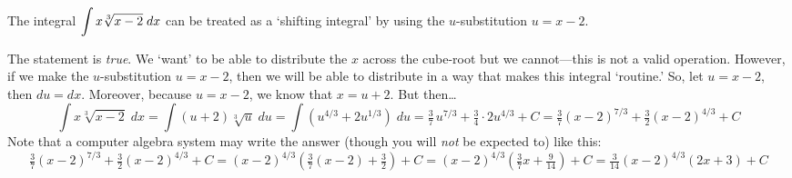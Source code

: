 \documentclass[11pt,letterpaper]{article}
\begin{document}
\thispagestyle{title}

 The integral $\displaystyle\int x \sqrt[3]{x - 2} \;dx$ can be treated as a `shifting integral' by using the $u$-substitution $u= x - 2$. \pspace

\sol The statement is \textit{true}. We `want' to be able to distribute the $x$ across the cube-root but we cannot---this is not a valid operation. However, if we make the $u$-substitution $u= x - 2$, then we will be able to distribute in a way that makes this integral `routine.' So, let $u= x - 2$, then $du= dx$. Moreover, because $u= x - 2$, we know that $x= u + 2$. But then\dots
	\[
	\int x \sqrt[3]{x - 2} \;dx= \int (u + 2) \sqrt[3]{u} \;du= \int \left( u^{4/3} + 2 u^{1/3} \right) \;du= \tfrac{3}{7}\, u^{7/3} + \tfrac{3}{4} \cdot 2u^{4/3} + C= \tfrac{3}{7} (x - 2)^{7/3} + \tfrac{3}{2} (x - 2)^{4/3} + C
	\]
Note that a computer algebra system may write the answer (though you will \textit{not} be expected to) like this:
	\[
	\tfrac{3}{7} (x - 2)^{7/3} + \tfrac{3}{2} (x - 2)^{4/3} + C= (x - 2)^{4/3} \left( \tfrac{3}{7} (x - 2) + \tfrac{3}{2} \right) + C= (x - 2)^{4/3} \left( \tfrac{3}{7}x + \tfrac{9}{14} \right) + C= \tfrac{3}{14} (x - 2)^{4/3} \left( 2x + 3 \right) + C
	\] \pvspace{1.3cm}
\end{document}
